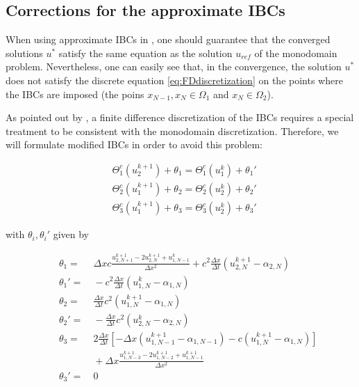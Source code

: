 \subsection{Corrections for the approximate IBCs}

\indent When using approximate IBCs in , one should guarantee that the converged solutions $u^*$ satisfy the same equation as the solution $u_{ref}$ of the monodomain problem. Nevertheless, one can easily see that, in the convergence, the solution $u^*$ does not satisfy the discrete equation \eqref{eq:FDdiscretization} on the points where the IBCs are imposed (the poins $x_{N-1},x_N \in \Omega_1$ and $x_N \in \Omega_2$). 

\indent As pointed out by \cite{Gander2001}, a finite difference discretization of the IBCs requires a special treatment to be consistent with the monodomain discretization. Therefore, we will formulate modified IBCs  in order to avoid this problem:

\begin{align}
	\label{eq:correctedTBC}
        &\Theta_1^{c}(u_2^{k+1}) + \theta_1 = \Theta_1^{c}(u_1^{k}) + \theta_1' \\
        &\Theta_2^{c}(u_1^{k+1}) + \theta_2 = \Theta_2^{c}(u_2^{k}) + \theta_2' \\
        &\Theta_3^{c}(u_1^{k+1}) + \theta_3 = \Theta_3^{c}(u_2^{k}) + \theta_3'
\end{align}

\noindent with $\theta_i, \theta_i'$ given by

\begin{align*}
    &&\theta_1 = & \  \Delta x c \frac{u_{2,N+1}^{k+1} - 2u_{2,N}^{k+1} + u_{1,N-1}^{k}}{\Delta x^2} + c^2\frac{\Delta x}{\Delta t} \left( u_{2,N}^{k+1} - \alpha_{2,N} \right)\\
    &&\theta_1' = & \ - c^2\frac{\Delta x}{\Delta t} \left( u_{1,N}^{k} - \alpha_{1,N} \right)\\
	&&\theta_2 = & \ \frac{\Delta x}{\Delta t} c^2 \left(u_{1,N}^{k+1} - \alpha_{1,N}\right) \\
    &&\theta_2' = & \ -\frac{\Delta x}{\Delta t} c^2 \left(u_{2,N}^{k} - \alpha_{2,N}\right)\\
    &&\theta_3  = & \ 2\frac{\Delta x}{\Delta t} \left[-\Delta x \left(u_{1,N-1}^{k+1} - \alpha_{1,N-1} \right) - c \left(u_{1,N}^{k+1} - \alpha_{1,N}  \right) \right] \\  
    && & \  + \Delta x \frac{u_{1,N-3}^{k+1} - 2u_{1,N-2}^{k+1} + u_{1,N-1}^{k+1}}{\Delta x^2} \\
    &&\theta_3' = & \ 0
\end{align*}

